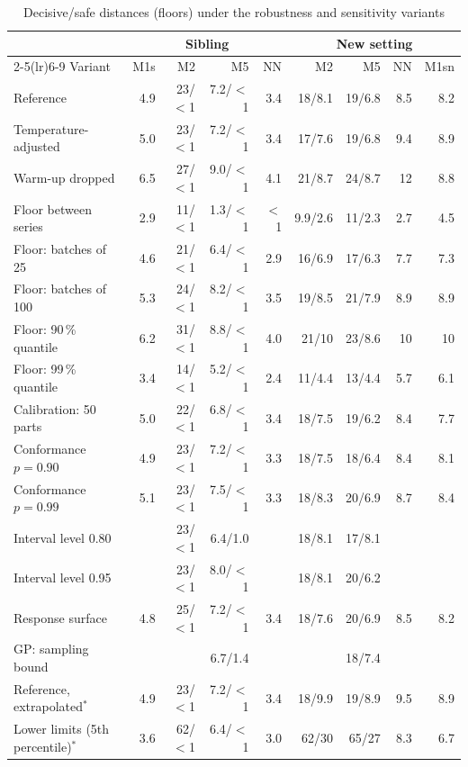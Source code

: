 \documentclass[pdflatex,sn-basic]{sn-jnl}
\newcommand{\tabsizesmall}{\footnotesize}
\begin{document}
\begin{table}[p]
\tabsizesmall
\setlength{\tabcolsep}{2.4pt}
\caption{Decisive/safe distances (floors) under the robustness and sensitivity variants}\label{tab:s-variants}
\begin{tabular}{@{}lrrrrrrrr@{}}
\toprule
 & \multicolumn{4}{c}{Sibling} & \multicolumn{4}{c}{New setting} \\
\cmidrule(lr){2-5}\cmidrule(lr){6-9}
Variant & M1s & M2 & M5 & NN & M2 & M5 & NN & M1sn \\
\midrule
Reference & 4.9 & 23/$<$1 & 7.2/$<$1 & 3.4 & 18/8.1 & 19/6.8 & 8.5 & 8.2 \\
Temperature-adjusted & 5.0 & 23/$<$1 & 7.2/$<$1 & 3.4 & 17/7.6 & 19/6.8 & 9.4 & 8.9 \\
Warm-up dropped & 6.5 & 27/$<$1 & 9.0/$<$1 & 4.1 & 21/8.7 & 24/8.7 & 12 & 8.8 \\
Floor between series & 2.9 & 11/$<$1 & 1.3/$<$1 & $<$1 & 9.9/2.6 & 11/2.3 & 2.7 & 4.5 \\
Floor: batches of 25 & 4.6 & 21/$<$1 & 6.4/$<$1 & 2.9 & 16/6.9 & 17/6.3 & 7.7 & 7.3 \\
Floor: batches of 100 & 5.3 & 24/$<$1 & 8.2/$<$1 & 3.5 & 19/8.5 & 21/7.9 & 8.9 & 8.9 \\
Floor: 90\,\% quantile & 6.2 & 31/$<$1 & 8.8/$<$1 & 4.0 & 21/10 & 23/8.6 & 10 & 10 \\
Floor: 99\,\% quantile & 3.4 & 14/$<$1 & 5.2/$<$1 & 2.4 & 11/4.4 & 13/4.4 & 5.7 & 6.1 \\
Calibration: 50 parts & 5.0 & 22/$<$1 & 6.8/$<$1 & 3.4 & 18/7.5 & 19/6.2 & 8.4 & 7.7 \\
Conformance $p=0.90$ & 4.9 & 23/$<$1 & 7.2/$<$1 & 3.3 & 18/7.5 & 18/6.4 & 8.4 & 8.1 \\
Conformance $p=0.99$ & 5.1 & 23/$<$1 & 7.5/$<$1 & 3.3 & 18/8.3 & 20/6.9 & 8.7 & 8.4 \\
Interval level 0.80 &  & 23/$<$1 & 6.4/1.0 &  & 18/8.1 & 17/8.1 &  & \\
Interval level 0.95 &  & 23/$<$1 & 8.0/$<$1 &  & 18/8.1 & 20/6.2 &  & \\
Response surface & 4.8 & 25/$<$1 & 7.2/$<$1 & 3.4 & 18/7.6 & 20/6.9 & 8.5 & 8.2 \\
GP: sampling bound &  &  & 6.7/1.4 &  &  & 18/7.4 &  & \\
\midrule Reference, extrapolated$^*$ & 4.9 & 23/$<$1 & 7.2/$<$1 & 3.4 & 18/9.9 & 19/8.9 & 9.5 & 8.9 \\
Lower limits (5th percentile)$^*$ & 3.6 & 62/$<$1 & 6.4/$<$1 & 3.0 & 62/30 & 65/27 & 8.3 & 6.7 \\

\end{tabular}
\end{table}
\end{document}
